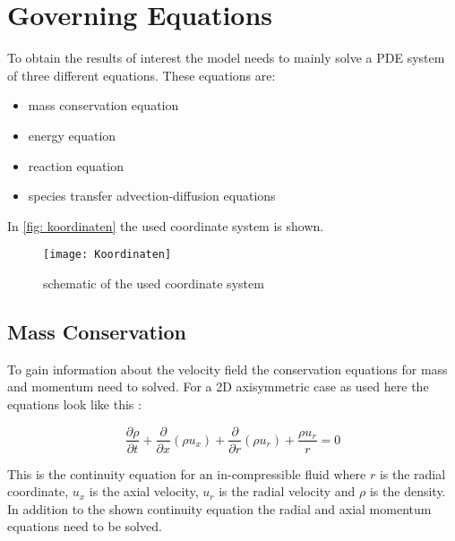 \documentclass[../thesis.tex]{subfiles}
\begin{document}
\section{Governing Equations}
\label{sec:gov_eqn}
To obtain the results of interest the model needs to mainly solve a PDE system of three different equations. These equations are:
\begin{itemize}
	\item mass conservation equation
	\item energy equation
	\item reaction equation
	\item species transfer advection-diffusion equations
\end{itemize}
In \autoref{fig: koordinaten} the used coordinate system is shown.
\begin{figure}[htb]
	\centering
	\texttt{[image: Koordinaten]}
	\caption{schematic of the used coordinate system}
	\label{fig: koordinaten}
\end{figure}

\subsection{Mass Conservation}
To gain information about the velocity field the conservation equations for mass and momentum need to solved. For a 2D axisymmetric case as used here the equations look like this \cite{manual2009ansys}:

\begin{equation}
\label{eqn:ansys_conti}
\dfrac{\partial \rho}{\partial t} + \dfrac{\partial}{\partial x} (\rho u_x) + \dfrac{\partial }{\partial r} (\rho u_r)
+ \dfrac{\rho u_r}{r} = 0
\end{equation}

This is the continuity equation for an in-compressible fluid where $r$ is the radial coordinate, $u_x$ is the axial velocity, $u_r$ is the radial velocity and $\rho$ is the density. In addition to the shown continuity equation the radial and axial momentum equations need to be solved.

\end{document}

